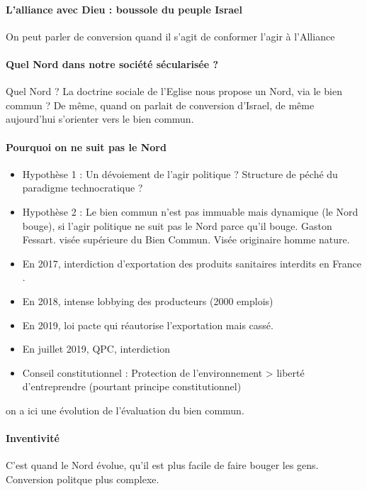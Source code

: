 \paragraph{L'alliance avec Dieu : boussole du peuple Israel} On peut parler de conversion quand il s'agit de conformer l'agir à l'Alliance

\paragraph{Quel Nord dans notre société sécularisée ?} Quel Nord ? La doctrine sociale de l'Eglise nous propose un Nord, via le bien commun ? De même, quand on parlait de conversion d'Israel, de même aujourd'hui s'orienter vers le bien commun.
\paragraph{Pourquoi on ne suit pas le Nord}
\begin{itemize}
    \item Hypothèse 1  : Un dévoiement de l'agir politique ? Structure de péché du paradigme technocratique ? 
    \item Hypothèse 2 : Le bien commun n'est pas immuable mais dynamique (le Nord bouge), si l'agir politique ne suit pas le Nord parce qu'il bouge. Gaston Fessart. visée supérieure du Bien Commun. Visée originaire homme nature. 
\end{itemize}

\begin{Ex}
\begin{itemize}
    \item  En 2017, interdiction d'exportation des produits sanitaires interdits en France .
     \item   En 2018, intense lobbying des producteurs (2000 emplois)
   \item     En 2019, loi pacte qui réautorise l'exportation mais cassé.
   \item     En juillet 2019, QPC, interdiction 
     \item   Conseil constitutionnel : Protection de l'environnement > liberté d'entreprendre (pourtant principe constitutionnel)
    
\end{itemize}
   on a ici une évolution de l'évaluation du bien commun.
\end{Ex}

\paragraph{Inventivité} C'est quand le Nord évolue, qu'il est plus facile de faire bouger les gens. Conversion politque plus complexe. 
